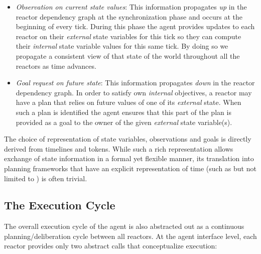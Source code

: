 \begin{itemize}

\item {\em Observation on current state values}: This information
  propagates \emph{up} in the reactor dependency graph at the
  synchronization phase and occurs at the beginning of every
  tick. During this phase the agent provides updates to each reactor
  on their {\em external} state variables for this tick so they can
  compute their {\em internal} state variable values for this same
  tick. By doing so we propagate a consistent view of that state of
  the world throughout all the reactors as time
  advances. 

\item {\em Goal request on future state}: This information propagates
  \emph{down} in the reactor dependency graph. In order to satisfy own
  {\em internal} objectives, a reactor may have a plan that relies on
  future values of one of its {\em external} state. When such a plan
  is identified the agent ensures that this part of the plan is
  provided as a goal to the owner of the given {\em external} state
  variable(s). 

\end{itemize}

The choice of representation of state variables, observations and
goals is directly derived from \eu timelines and tokens.  While such a
rich representation allows exchange of state information in a formal
yet flexible manner, its translation into planning frameworks that
have an explicit representation of time (such as but not limited to
\eu) is often trivial.

\subsection{The Execution Cycle}
\label{sec:arch:exec}

The overall execution cycle of the agent is also abstracted out as a
continuous planning/deliberation cycle between all reactors. At the
agent interface level, each reactor provides only two abstract calls
that conceptualize execution:


